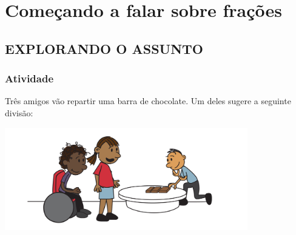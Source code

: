 %
%
%


\setcounter{chapter}{0}
\chapter{Começando a falar sobre frações }
\setcounter{page}{1}
\section{EXPLORANDO O ASSUNTO }

\subsection{Atividade}

Três amigos vão repartir uma barra de chocolate. Um deles sugere a seguinte divisão:

  \begin{center}
    \includegraphics[width=300pt, keepaspectratio]{../figuras/licao01/ativ1_fig01.png}
  \end{center}


